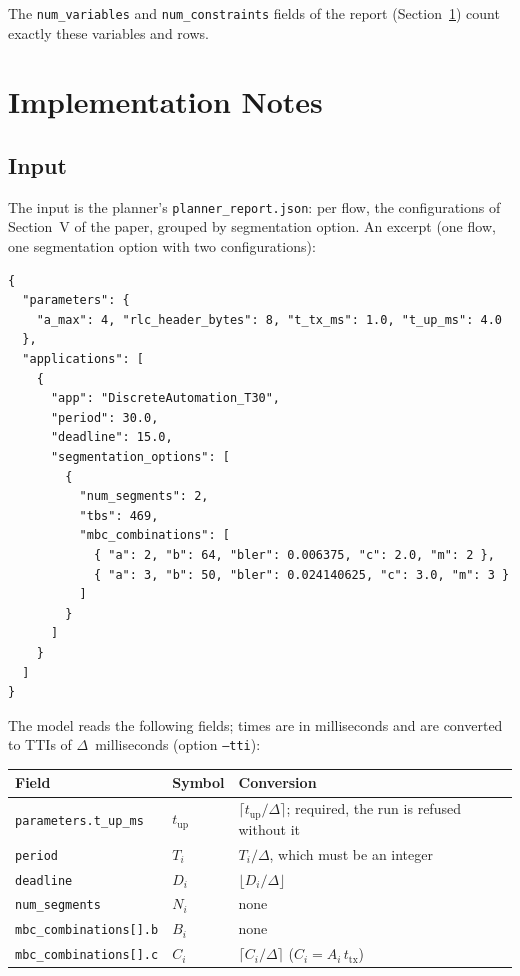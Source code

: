 \documentclass[11pt]{article}
\begin{document}
The \texttt{num\_variables} and \texttt{num\_constraints} fields of the report
(Section~\ref{sec:impl}) count exactly these variables and rows.


\section{Implementation Notes}\label{sec:impl}

\subsection*{Input}

The input is the planner's \texttt{planner\_report.json}: per flow, the
configurations of Section~V of the paper, grouped by segmentation option.
An excerpt (one flow, one segmentation option with two configurations):

\begin{lstlisting}
{
  "parameters": {
    "a_max": 4, "rlc_header_bytes": 8, "t_tx_ms": 1.0, "t_up_ms": 4.0
  },
  "applications": [
    {
      "app": "DiscreteAutomation_T30",
      "period": 30.0,
      "deadline": 15.0,
      "segmentation_options": [
        {
          "num_segments": 2,
          "tbs": 469,
          "mbc_combinations": [
            { "a": 2, "b": 64, "bler": 0.006375, "c": 2.0, "m": 2 },
            { "a": 3, "b": 50, "bler": 0.024140625, "c": 3.0, "m": 3 }
          ]
        }
      ]
    }
  ]
}
\end{lstlisting}

The model reads the following fields; times are in milliseconds and are
converted to TTIs of $\Delta$~milliseconds (option \texttt{--tti}):

\begin{center}
\begin{tabular}{lll}
\toprule
\textbf{Field} & \textbf{Symbol} & \textbf{Conversion} \\
\midrule
\texttt{parameters.t\_up\_ms} & $t_\mathrm{up}$ & $\lceil t_\mathrm{up} / \Delta \rceil$; required, the run is refused without it \\
\texttt{period} & $T_i$ & $T_i / \Delta$, which must be an integer \\
\texttt{deadline} & $D_i$ & $\lfloor D_i / \Delta \rfloor$ \\
\texttt{num\_segments} & $N_i$ & none \\
\texttt{mbc\_combinations[].b} & $B_i$ & none \\
\texttt{mbc\_combinations[].c} & $C_i$ & $\lceil C_i / \Delta \rceil$ ($C_i = A_i\, t_\mathrm{tx}$) \\
\bottomrule
\end{tabular}
\end{center}
\end{document}
